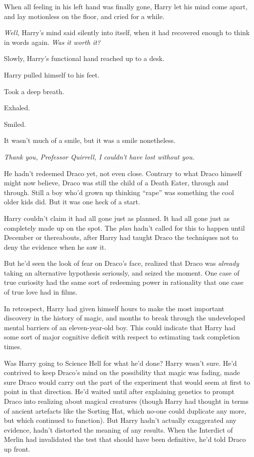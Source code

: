 When all feeling in his left hand was finally gone, Harry let his mind come apart, and lay motionless on the floor, and cried for a while.

\emph{Well,} Harry’s mind said silently into itself, when it had recovered enough to think in words again. \emph{Was it worth it?}

Slowly, Harry’s functional hand reached up to a desk.

Harry pulled himself to his feet.

Took a deep breath.

Exhaled.

Smiled.

It wasn’t much of a smile, but it was a smile nonetheless.

\emph{Thank you, Professor Quirrell, I couldn’t have lost without you.}

He hadn’t redeemed Draco yet, not even close. Contrary to what Draco himself might now believe, Draco was still the child of a Death Eater, through and through. Still a boy who’d grown up thinking “rape” was something the cool older kids did. But it was one heck of a start.

Harry couldn’t claim it had all gone just as planned. It had all gone just as completely made up on the spot. The \emph{plan} hadn’t called for this to happen until December or thereabouts, after Harry had taught Draco the techniques not to deny the evidence when he saw it.

But he’d seen the look of fear on Draco’s face, realized that Draco was \emph{already} taking an alternative hypothesis seriously, and seized the moment. One case of true curiosity had the same sort of redeeming power in rationality that one case of true love had in films.

In retrospect, Harry had given himself hours to make the most important discovery in the history of magic, and months to break through the undeveloped mental barriers of an eleven-year-old boy. This could indicate that Harry had some sort of major cognitive deficit with respect to estimating task completion times.

Was Harry going to Science Hell for what he’d done? Harry wasn’t sure. He’d contrived to keep Draco’s mind on the possibility that magic was fading, made sure Draco would carry out the part of the experiment that would seem at first to point in that direction. He’d waited until after explaining genetics to prompt Draco into realizing about magical creatures (though Harry had thought in terms of ancient artefacts like the Sorting Hat, which no-one could duplicate any more, but which continued to function). But Harry hadn’t actually exaggerated any evidence, hadn’t distorted the meaning of any results. When the Interdict of Merlin had invalidated the test that should have been definitive, he’d told Draco up front.

